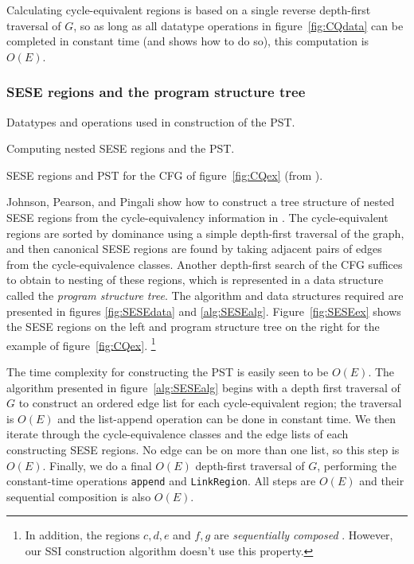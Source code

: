 \documentclass[12pt,titlepage,twoside]{article}
\newcommand*{\figscale}{1.0}
\begin{document}
Calculating cycle-equivalent regions is based on a single reverse
depth-first traversal of $G$, so as long as all datatype operations in
figure~\ref{fig:CQdata} can be completed in constant time (and
\cite{johnson93:sese} shows how to do so), this computation is $O(E)$.

\subsubsection{SESE regions and the program structure tree}
\begin{myfigure}\small
\caption{Datatypes and operations used in construction of the PST.}
\label{fig:SESEdata}\end{myfigure}
\begin{myalgorithm}\small
\caption{Computing nested SESE regions and the PST.}
\label{alg:SESEalg}\end{myalgorithm}
\begin{myfigure}\centering
\vertcenter{\renewcommand*{\figscale}{0.5}}\hspace{1cm}
\vertcenter{\renewcommand*{\figscale}{0.7}}
\caption{SESE regions and PST for the CFG of
         figure~\ref{fig:CQex} (from \cite{johnson94:pst}).}
\label{fig:SESEex}\end{myfigure}

Johnson, Pearson, and Pingali show how to construct a tree structure
of nested SESE regions from the cycle-equivalency information in
\cite{johnson94:pst}.  The cycle-equivalent regions are sorted by
dominance using a simple depth-first traversal of the graph, and then
canonical SESE regions are found by taking adjacent pairs of
edges from the cycle-equivalence classes.  Another depth-first search
of the CFG suffices to obtain to nesting of these regions,
which is represented in a data structure called the 
\emph{program structure tree}.
The algorithm and data structures required are presented in figures
\ref{fig:SESEdata} and \ref{alg:SESEalg}.  Figure~\vref{fig:SESEex}
shows the SESE regions on the left and program structure tree on
the right for the example of figure~\vref{fig:CQex}.%
\footnote{In addition, the regions ${c,d,e}$ and ${f,g}$ are
\emph{sequentially composed} \cite{johnson94:pst}. 
However, our SSI construction algorithm doesn't use this property.}

The time complexity for constructing the PST is easily seen to be
$O(E)$. The algorithm presented in figure~\vref{alg:SESEalg} begins
with a depth first traversal of $G$ to construct an ordered edge list
for each cycle-equivalent region; the traversal is $O(E)$ and the
list-append operation can be done in constant time.  We then iterate
through the cycle-equivalence classes and the edge lists of each
constructing SESE regions.  No edge can be on more than one list, so
this step is $O(E)$.  Finally, we do a final $O(E)$ depth-first
traversal of $G$, performing the constant-time operations {\tt append}
and {\tt LinkRegion}.  All steps are $O(E)$ and their sequential
composition is also $O(E)$.
\end{document}
